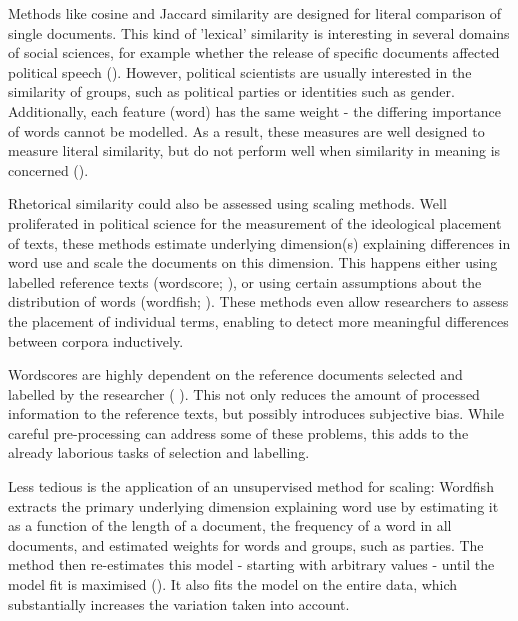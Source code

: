 \documentclass{article}
\begin{document}
Methods like cosine and Jaccard similarity are designed for literal comparison of single documents. This kind of 'lexical' similarity is interesting in several domains of social sciences, for example whether the release of specific documents affected political speech (\cite{Similarity2007a, Hager2020}). However, political scientists are usually interested in the similarity of groups, such as political parties or identities such as gender. Additionally, each feature (word) has the same weight - the differing importance of words cannot be modelled.%
As a result, these measures are well designed to measure literal similarity, but do not perform well when similarity in meaning is concerned (\cite{Prasetya2018}).\par

Rhetorical similarity could also be assessed using scaling methods. Well proliferated in political science for the measurement of the ideological placement of texts, these methods estimate underlying dimension(s) explaining differences in word use and scale the documents on this dimension. This happens either using labelled reference texts (wordscore; \cite{Laver2003}), or using certain assumptions about the distribution of words (wordfish; \cite{Slapin2008}). These methods even allow researchers to assess the placement of individual terms, enabling to detect more meaningful differences between corpora inductively. \par

Wordscores are highly dependent on the reference documents selected and labelled by the researcher ( \cite{Lowe2008}). This not only reduces the amount of processed information to the reference texts, but possibly introduces subjective bias. While careful pre-processing can address some of these problems, this adds to the already laborious tasks of selection and labelling.\par

Less tedious is the application of an unsupervised method for scaling: Wordfish extracts the primary underlying dimension explaining word use by estimating it as a function of the length of a document, the frequency of a word in all documents, and estimated weights for words and groups, such as parties. The method then re-estimates this model - starting with arbitrary values - until the model fit is maximised (\cite{Slapin2008}). It also fits the model on the entire data, which substantially increases the variation taken into account.\par
\end{document}
